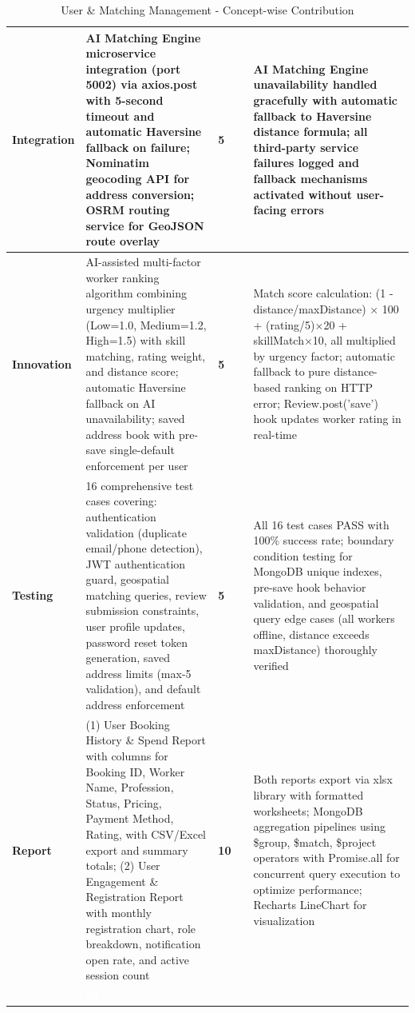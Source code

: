 \documentclass[12pt,a4paper]{article}
\begin{document}
\begin{table}[h!]
\begin{tabular}{|p{1.8cm}|p{4.5cm}|>{\centering\arraybackslash}p{1.5cm}|>{\centering\arraybackslash}p{1.5cm}|p{5.7cm}|}
\textbf{Integration} & 
AI Matching Engine microservice integration (port 5002) via axios.post with 5-second timeout and automatic Haversine fallback on failure; Nominatim geocoding API for address conversion; OSRM routing service for GeoJSON route overlay
& \textbf{5} & & 
AI Matching Engine unavailability handled gracefully with automatic fallback to Haversine distance formula; all third-party service failures logged and fallback mechanisms activated without user-facing errors \\
\hline
\rowcolor{lightgray}
\textbf{Innovation} & 
AI-assisted multi-factor worker ranking algorithm combining urgency multiplier (Low=1.0, Medium=1.2, High=1.5) with skill matching, rating weight, and distance score; automatic Haversine fallback on AI unavailability; saved address book with pre-save single-default enforcement per user
& \textbf{5} & & 
Match score calculation: (1 - distance/maxDistance) × 100 + (rating/5)×20 + skillMatch×10, all multiplied by urgency factor; automatic fallback to pure distance-based ranking on HTTP error; Review.post('save') hook updates worker rating in real-time \\
\hline

\textbf{Testing} & 
16 comprehensive test cases covering: authentication validation (duplicate email/phone detection), JWT authentication guard, geospatial matching queries, review submission constraints, user profile updates, password reset token generation, saved address limits (max-5 validation), and default address enforcement
& \textbf{5} & & 
All 16 test cases PASS with 100\% success rate; boundary condition testing for MongoDB unique indexes, pre-save hook behavior validation, and geospatial query edge cases (all workers offline, distance exceeds maxDistance) thoroughly verified \\
\hline
\rowcolor{lightgray}
\textbf{Report} & 
(1) User Booking History \& Spend Report with columns for Booking ID, Worker Name, Profession, Status, Pricing, Payment Method, Rating, with CSV/Excel export and summary totals; (2) User Engagement \& Registration Report with monthly registration chart, role breakdown, notification open rate, and active session count
& \textbf{10} & & 
Both reports export via xlsx library with formatted worksheets; MongoDB aggregation pipelines using \$group, \$match, \$project operators with Promise.all for concurrent query execution to optimize performance; Recharts LineChart for visualization \\
\hline
\hline
\rowcolor{headerblue}
\multicolumn{2}{|r|}{\textcolor{white}{\textbf{TOTAL}}} & \textcolor{white}{\textbf{50}} & & \\
\hline
\end{tabular}
\caption{User \& Matching Management - Concept-wise Contribution}
\renewcommand{\arraystretch}{1}
\end{table}
\end{document}
